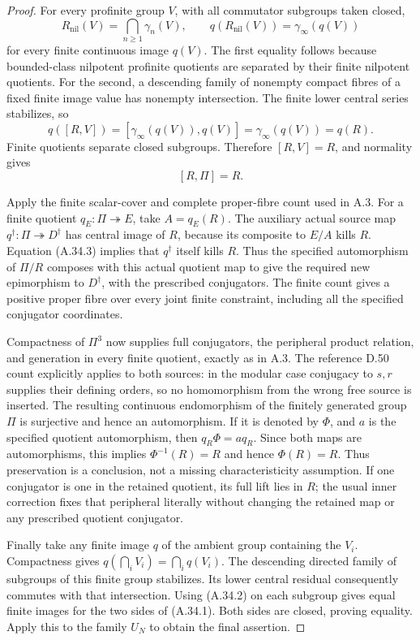\begin{proof}
For every profinite group \(V\), with all commutator
subgroups taken closed,
\[
 R_{\mathrm{nil}}(V)=\bigcap_{n\ge1}\gamma_n(V),
 \qquad
 q(R_{\mathrm{nil}}(V))=
                   \gamma_\infty(q(V))
 \tag{A.34.2}
\]
for every finite continuous image \(q(V)\).
The first equality follows because bounded-class
nilpotent profinite quotients are separated by their
finite nilpotent quotients. For the second, a
descending family of nonempty compact fibres of
a fixed finite image value has nonempty intersection.
The finite lower central series stabilizes, so
\[
 q([R,V])=[\gamma_\infty(q(V)),q(V)]
          =\gamma_\infty(q(V))=q(R).
\]
Finite quotients separate closed subgroups. Therefore
\([R,V]=R\), and normality gives
\[
                             [R,\Pi]=R.
 \tag{A.34.3}
\]

Apply the finite scalar-cover and complete proper-fibre
count used in A.3. For a finite quotient
\(q_E:\Pi\twoheadrightarrow E\), take
\(A=q_E(R)\). The auxiliary actual source map
\(q^\dagger:\Pi\twoheadrightarrow D^\dagger\)
has central image of \(R\), because its composite
to \(E/A\) kills \(R\).
Equation (A.34.3) implies that \(q^\dagger\) itself
kills \(R\). Thus the specified automorphism of
\(\Pi/R\) composes with this actual quotient map
to give the required new epimorphism to
\(D^\dagger\), with the prescribed conjugators.
The finite count gives a positive proper fibre over
every joint finite constraint, including all the
specified conjugator coordinates.

Compactness of \(\Pi^3\) now supplies full
conjugators, the peripheral product relation, and
generation in every finite quotient, exactly as
in A.3. The reference D.50 count explicitly applies
to both sources: in the modular case conjugacy
to \(s,r\) supplies their defining orders, so no
homomorphism from the wrong free source is inserted.
The resulting continuous endomorphism of the
finitely generated group \(\Pi\) is surjective
and hence an automorphism. If it is denoted by
\(\Phi\), and \(a\) is the specified quotient
automorphism, then \(q_R\Phi=a q_R\).
Since both maps are automorphisms, this implies
\(\Phi^{-1}(R)=R\) and hence \(\Phi(R)=R\).
Thus preservation is a conclusion, not a missing
characteristicity assumption. If one conjugator
is one in the retained quotient, its full lift
lies in \(R\); the usual inner correction fixes
that peripheral literally without changing the
retained map or any prescribed quotient conjugator.

Finally take any finite image \(q\) of the ambient
group containing the \(V_i\). Compactness gives
\(q(\bigcap_iV_i)=\bigcap_iq(V_i)\).
The descending directed family of subgroups of
this finite group stabilizes. Its lower central
residual consequently commutes with that intersection.
Using (A.34.2) on each subgroup gives equal finite
images for the two sides of (A.34.1). Both sides
are closed, proving equality. Apply this to
the family \(U_N\) to obtain the final assertion.
\end{proof}

